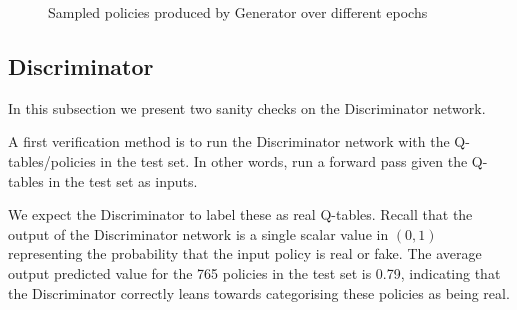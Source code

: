 \begin{figure}
{\hskip 2cm
\vskip 0.5cm
\hskip 2cm
}
\caption{Sampled policies produced by Generator over different epochs}
\label{fig:sampled_policies}
\vskip -2mm
\end{figure}

\subsection{Discriminator}
In this subsection we present two sanity checks on the Discriminator network.

A first verification method is to run the Discriminator network with the Q-tables/policies in the test set. In other words, run a forward pass given the Q-tables in the test set as inputs.

We expect the Discriminator to label these as real Q-tables. Recall that the output of the Discriminator network is a single scalar value in $(0,1)$ representing the probability that the input policy is real or fake. The average output predicted value for the 765 policies in the test set is 0.79, indicating that the Discriminator correctly leans towards categorising these policies as being real.

